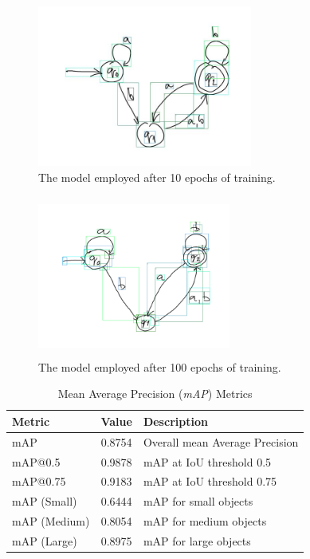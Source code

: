 \documentclass[conference]{IEEEtran}
\begin{document}
\begin{figure}[H]
	\centering
	\includegraphics[width=200pt, height=150pt]{bbox2.jpg}
	\caption{The model employed after 10 epochs of training.}
	\label{fig:bbox2}
\end{figure}

\begin{figure}[H]
	\centering
	\includegraphics[width=180pt, height=150pt]{bbox3.png}
	\caption{The model employed after 100 epochs of training. }
	\label{fig:bbox3}
\end{figure}

\begin{table}[htbp]
	\centering
	\caption{Mean Average Precision (\textit{mAP}) Metrics}
	\begin{tabular}{|l|c|l|}
		\hline
		\textbf{Metric} & \textbf{Value} & \textbf{Description} \\
		\hline
		mAP & 0.8754 & Overall mean Average Precision \\
		mAP@0.5 & 0.9878 & mAP at IoU threshold 0.5 \\
		mAP@0.75 & 0.9183 & mAP at IoU threshold 0.75 \\
		\hline
		mAP (Small) & 0.6444 & mAP for small objects \\
		mAP (Medium) & 0.8054 & mAP for medium objects \\
		mAP (Large) & 0.8975 & mAP for large objects \\
		\hline
	\end{tabular}
	\label{tab:map}
\end{table}
\end{document}
